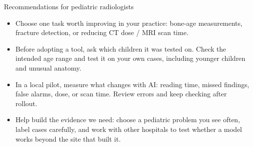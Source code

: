 \documentclass[aspectratio=169]{beamer}
\begin{document}
\begin{frame}{Recommendations for pediatric radiologists}
\begin{itemize}
  \setlength{\itemsep}{12pt}
  \item Choose one task worth improving in your practice: bone-age measurements,
        fracture detection, or reducing CT dose / MRI scan time.
  \item Before adopting a tool, ask which children it was tested on. Check the
        intended age range and test it on your own cases, including younger children
        and unusual anatomy.
  \item In a local pilot, measure what changes with AI: reading time, missed findings,
        false alarms, dose, or scan time. Review errors and keep checking after rollout.
  \item Help build the evidence we need: choose a pediatric problem you see often,
        label cases carefully, and work with other hospitals to test whether a model
        works beyond the site that built it.
\end{itemize}
\end{frame}
\end{document}
